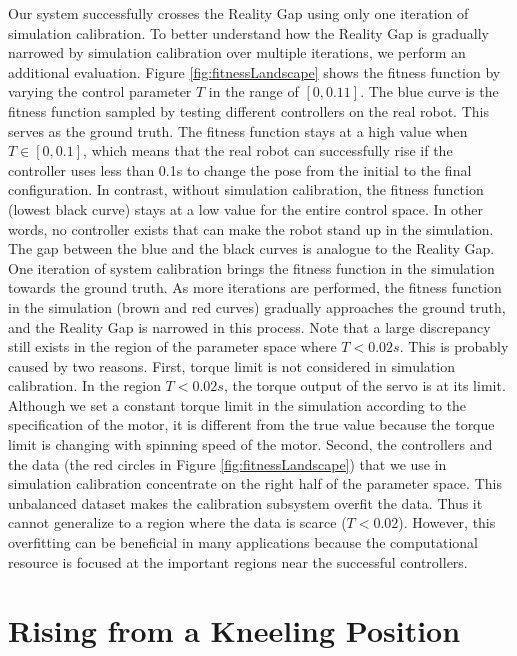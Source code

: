 Our system successfully crosses the Reality Gap using only one iteration of simulation calibration. To better understand how the Reality Gap is gradually narrowed by simulation calibration over multiple iterations, we perform an additional evaluation. Figure \ref{fig:fitnessLandscape} shows the fitness function by varying the control parameter $T$ in the range of $[0, 0.11]$. The blue curve is the fitness function sampled by testing different controllers on the real robot. This serves as the ground truth. The fitness function stays at a high value when $T\in[0, 0.1]$, which means that the real robot can successfully rise if the controller uses less than 0.1s to change the pose from the initial to the final configuration. In contrast, without simulation calibration, the fitness function (lowest black curve) stays at a low value for the entire control space. In other words, no controller exists that can make the robot stand up in the simulation. The gap between the blue and the black curves is analogue to the Reality Gap. One iteration of system calibration brings the fitness function in the simulation towards the ground truth. As more iterations are performed, the fitness function in the simulation (brown and red curves) gradually approaches the ground truth, and the Reality Gap is narrowed in this process. Note that a large discrepancy still exists in the region of the parameter space where $T<0.02s$. This is probably caused by two reasons. First, torque limit is not considered in simulation calibration. In the region $T<0.02s$, the torque output of the servo is at its limit. Although we set a constant torque limit in the simulation according to the specification of the motor, it is different from the true value because the torque limit is changing with spinning speed of the motor. Second, the controllers and the data (the red circles in Figure \ref{fig:fitnessLandscape}) that we use in simulation calibration concentrate on the right half of the parameter space. This unbalanced dataset makes the calibration subsystem overfit the data. Thus it cannot generalize to a region where the data is scarce ($T<0.02$). However, this overfitting can be beneficial in many applications because the computational resource is focused at the important regions near the successful controllers.


\section{Rising from a Kneeling Position}

